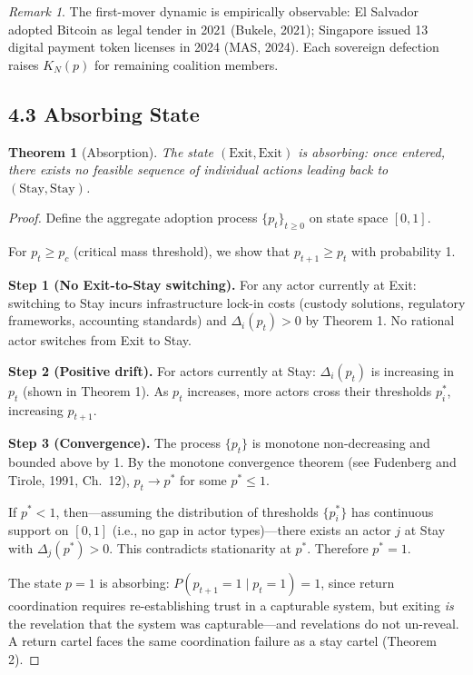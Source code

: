 \documentclass[12pt]{article}
\newtheorem{theorem}{Theorem}
\theoremstyle{definition}
\theoremstyle{remark}
\newtheorem*{remark}{Remark}
\begin{document}
\begin{remark}
The first-mover dynamic is empirically observable: El Salvador adopted
Bitcoin as legal tender in 2021 (Bukele, 2021); Singapore issued 13
digital payment token licenses in 2024 (MAS, 2024). Each sovereign
defection raises $K_N(p)$ for remaining coalition members.
\end{remark}

\subsection{4.3 Absorbing State}

\begin{theorem}[Absorption]
The state $(\text{Exit}, \text{Exit})$ is absorbing: once entered, there
exists no feasible sequence of individual actions leading back to
$(\text{Stay}, \text{Stay})$.
\end{theorem}

\begin{proof}
Define the aggregate adoption process $\{p_t\}_{t \geq 0}$ on state
space $[0, 1]$.

For $p_t \geq p_c$ (critical mass threshold), we show that
$p_{t+1} \geq p_t$ with probability 1.

\smallskip
\noindent\textbf{Step 1 (No Exit-to-Stay switching).} For any actor currently at
Exit: switching to Stay incurs infrastructure lock-in costs (custody
solutions, regulatory frameworks, accounting standards) and
$\Delta_i(p_t) > 0$ by Theorem 1. No rational actor switches from Exit
to Stay.

\smallskip
\noindent\textbf{Step 2 (Positive drift).} For actors currently at Stay:
$\Delta_i(p_t)$ is increasing in $p_t$ (shown in Theorem 1). As $p_t$
increases, more actors cross their thresholds $p_i^*$, increasing
$p_{t+1}$.

\smallskip
\noindent\textbf{Step 3 (Convergence).} The process $\{p_t\}$ is monotone
non-decreasing and bounded above by 1. By the monotone convergence
theorem (see Fudenberg and Tirole, 1991, Ch.\ 12), $p_t \to p^*$ for
some $p^* \leq 1$.

If $p^* < 1$, then---assuming the distribution of thresholds $\{p_i^*\}$
has continuous support on $[0, 1]$ (i.e., no gap in actor types)---there
exists an actor $j$ at Stay with $\Delta_j(p^*) > 0$. This contradicts
stationarity at $p^*$. Therefore $p^* = 1$.

The state $p = 1$ is absorbing: $P(p_{t+1} = 1 \mid p_t = 1) = 1$, since
return coordination requires re-establishing trust in a capturable
system, but exiting \emph{is} the revelation that the system was
capturable---and revelations do not un-reveal. A return cartel faces the
same coordination failure as a stay cartel (Theorem 2).
\end{proof}
\end{document}
